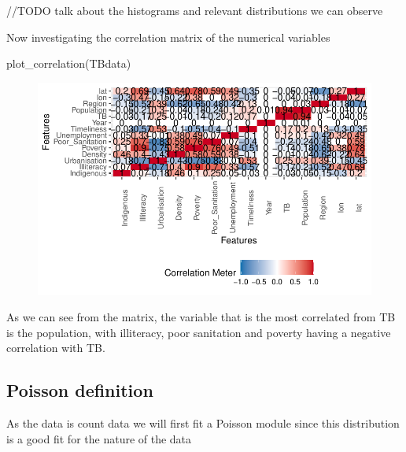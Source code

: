 \documentclass[
  letterpaper,
  DIV=11,
  numbers=noendperiod]{scrartcl}
\newenvironment{Shaded}{\begin{snugshade}}{\end{snugshade}}
\newcommand{\FunctionTok}[1]{\textcolor[rgb]{0.28,0.35,0.67}{#1}}
\newcommand{\NormalTok}[1]{\textcolor[rgb]{0.00,0.23,0.31}{#1}}
\begin{document}
//TODO talk about the histograms and relevant distributions we can
observe

Now investigating the correlation matrix of the numerical variables

\begin{Shaded}
\begin{Highlighting}[]
\FunctionTok{plot\_correlation}\NormalTok{(TBdata)}
\end{Highlighting}
\end{Shaded}

\begin{figure}[H]

{\centering \includegraphics{Group34Coursework_files/figure-pdf/unnamed-chunk-6-1.pdf}

}

\end{figure}

As we can see from the matrix, the variable that is the most correlated
from TB is the population, with illiteracy, poor sanitation and poverty
having a negative correlation with TB.

\hypertarget{poisson-definition}{%
\subsection{Poisson definition}\label{poisson-definition}}

As the data is count data we will first fit a Poisson module since this
distribution is a good fit for the nature of the data
\end{document}
